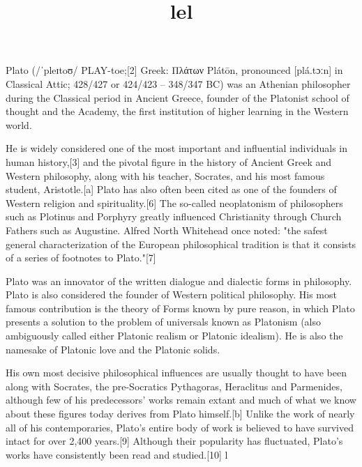 \documentclass{article}
\title{lel}
\begin{document}
Plato (/ˈpleɪtoʊ/ PLAY-toe;[2] Greek: Πλάτων Plátōn, pronounced [plá.tɔːn] in Classical Attic; 428/427 or 424/423 – 348/347 BC) was an Athenian philosopher during the Classical period in Ancient Greece, founder of the Platonist school of thought and the Academy, the first institution of higher learning in the Western world.

He is widely considered one of the most important and influential individuals in human history,[3] and the pivotal figure in the history of Ancient Greek and Western philosophy, along with his teacher, Socrates, and his most famous student, Aristotle.[a] Plato has also often been cited as one of the founders of Western religion and spirituality.[6] The so-called neoplatonism of philosophers such as Plotinus and Porphyry greatly influenced Christianity through Church Fathers such as Augustine. Alfred North Whitehead once noted: "the safest general characterization of the European philosophical tradition is that it consists of a series of footnotes to Plato."[7]

Plato was an innovator of the written dialogue and dialectic forms in philosophy. Plato is also considered the founder of Western political philosophy. His most famous contribution is the theory of Forms known by pure reason, in which Plato presents a solution to the problem of universals known as Platonism (also ambiguously called either Platonic realism or Platonic idealism). He is also the namesake of Platonic love and the Platonic solids.

His own most decisive philosophical influences are usually thought to have been along with Socrates, the pre-Socratics Pythagoras, Heraclitus and Parmenides, although few of his predecessors' works remain extant and much of what we know about these figures today derives from Plato himself.[b] Unlike the work of nearly all of his contemporaries, Plato's entire body of work is believed to have survived intact for over 2,400 years.[9] Although their popularity has fluctuated, Plato's works have consistently been read and studied.[10] l
\end{document}
